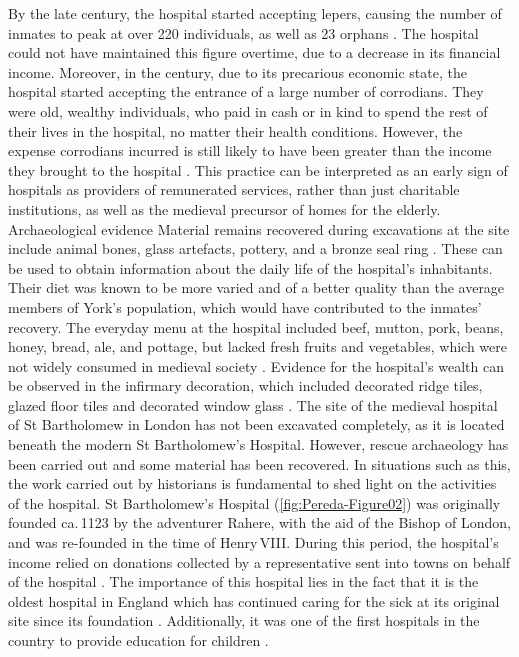 \documentclass[%
	]{ijsra}
\begin{document}
By the late  century\AD, the hospital started accepting lepers, causing the number of inmates to peak at over \num{220} individuals, as well as 23 orphans \parencites[6,10]{Cullum_1991}[151]{Palliser_2014}. The hospital could not have maintained this figure overtime, due to a decrease in its financial income. 
Moreover, in the  century\AD, due to its precarious economic state, the hospital started accepting the entrance of a large number of corrodians. They were old, wealthy individuals, who paid in cash or in kind to spend the rest of their lives in the hospital, no matter their health conditions. 
However, the expense corrodians incurred is still likely to have been greater than the income they brought to the hospital \parencites[235]{Brodman_2009}[6]{Cullum_1991}. This practice can be interpreted as an early sign of hospitals as providers of remunerated services, rather than just charitable institutions, as well as the medieval precursor of homes for the elderly.
Archaeological evidence
Material remains recovered during excavations at the site include animal bones, glass artefacts, pottery, and a bronze seal ring \parencite{Johnson_2014}. These can be used to obtain information about the daily life of the hospital’s inhabitants. Their diet was known to be more varied and of a better quality than the average members of York’s population, which would have contributed to the inmates’ recovery. 
The everyday menu at the hospital included beef, mutton, pork, beans, honey, bread, ale, and pottage, but lacked fresh fruits and vegetables, which were not widely consumed in medieval society \parencites[16-17]{Cullum_1991}[19]{Cullum_1999}. 
Evidence for the hospital’s wealth can be observed in the infirmary decoration, which included decorated ridge tiles, glazed floor tiles and decorated window glass \parencite[101]{Dean_2008}. 
\IJSRAseparator
The site of the medieval hospital of St Bartholomew in London has not been excavated completely, as it is located beneath the modern St Bartholomew’s Hospital. However, rescue archaeology has been carried out and some material has been recovered.
In situations such as this, the work carried out by historians is fundamental to shed light on the activities of the hospital. St Bartholomew’s Hospital (\cref{fig:Pereda-Figure02}) %
was originally founded ca.\,1123 by the adventurer Rahere, with the aid of the Bishop of London, and was re-founded in the time of Henry\,VIII. During this period, the hospital’s income relied on donations collected by a representative sent into towns on behalf of the hospital \parencite[19,42]{Dainton_1961}. 
The importance of this hospital lies in the fact that it is the oldest hospital in England which has continued caring for the sick at its original site since its foundation \parencite[35]{Dainton_1961}. 
Additionally, it was one of the first hospitals in the country to provide education for children \parencite[21]{Rawcliffe_1999}. 
\end{document}
